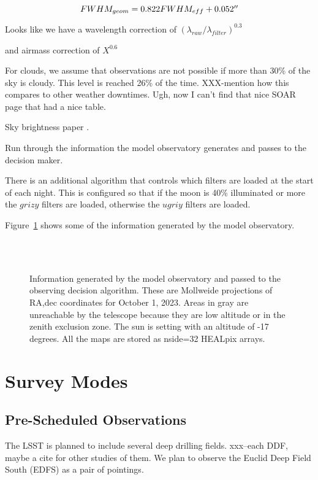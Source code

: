 \documentclass[]{aastex631}
\begin{document}
\begin{equation}
    FWHM_{geom} = 0.822 FWHM_{eff} + 0.052\arcsec
\end{equation}

Looks like we have a wavelength correction of $(\lambda_{raw}/\lambda_{filter})^{0.3}$

and airmass correction of $X^{0.6}$

For clouds, we assume that observations are not possible if more than 30\% of the sky is cloudy. This level is reached 26\% of the time. XXX-mention how this compares to other weather downtimes. Ugh, now I can't find that nice SOAR page that had a nice table.

Sky brightness paper \citep{Yoachim2016}. 


Run through the information the model observatory generates and passes to the decision maker.

There is an additional algorithm that controls which filters are loaded at the start of each night. This is configured so that if the moon is 40\% illuminated or more the $grizy$ filters are loaded, otherwise the $ugriy$ filters are loaded.

Figure~\ref{fig:conditions} shows some of the information generated by the model observatory. 

\begin{figure}
     \\
     \\
    \caption{Information generated by the model observatory and passed to the observing decision algorithm. These are Mollweide projections of RA,dec coordinates for October 1, 2023. Areas in gray are unreachable by the telescope because they are low altitude or in the zenith exclusion zone. The sun is setting with an altitude of -17 degrees. All the maps are stored as nside=32 HEALpix arrays. }
    \label{fig:conditions}
\end{figure}

\section{Survey Modes}

\subsection{Pre-Scheduled Observations}
The LSST is planned to include several deep drilling fields. xxx--each DDF, maybe a cite for other studies of them. We plan to observe the Euclid Deep Field South (EDFS) as a pair of pointings. 
\end{document}
